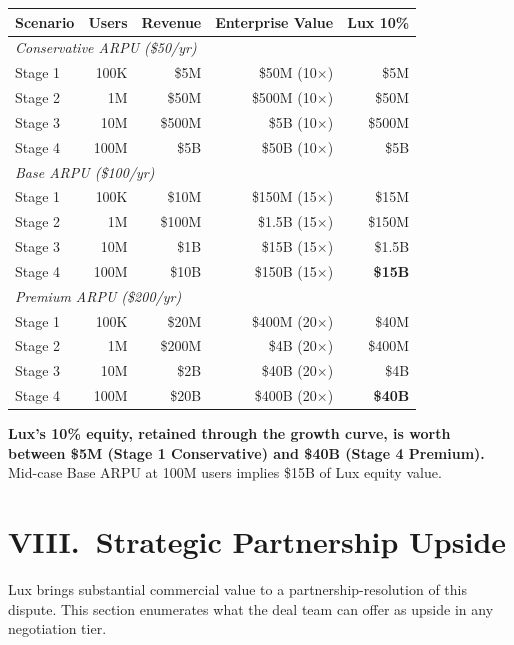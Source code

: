 \documentclass[11pt,letterpaper]{article}
\begin{document}
\begin{center}
\begin{small}
\begin{tabular}{lrrrr}
\toprule
\textbf{Scenario} & \textbf{Users} & \textbf{Revenue} & \textbf{Enterprise Value} & \textbf{Lux 10\%} \\
\midrule
\multicolumn{5}{l}{\textit{Conservative ARPU (\$50/yr)}} \\
Stage 1 & 100K & \$5M & \$50M (10$\times$) & \$5M \\
Stage 2 & 1M & \$50M & \$500M (10$\times$) & \$50M \\
Stage 3 & 10M & \$500M & \$5B (10$\times$) & \$500M \\
Stage 4 & 100M & \$5B & \$50B (10$\times$) & \$5B \\
\midrule
\multicolumn{5}{l}{\textit{Base ARPU (\$100/yr)}} \\
Stage 1 & 100K & \$10M & \$150M (15$\times$) & \$15M \\
Stage 2 & 1M & \$100M & \$1.5B (15$\times$) & \$150M \\
Stage 3 & 10M & \$1B & \$15B (15$\times$) & \$1.5B \\
Stage 4 & 100M & \$10B & \$150B (15$\times$) & \textbf{\$15B} \\
\midrule
\multicolumn{5}{l}{\textit{Premium ARPU (\$200/yr)}} \\
Stage 1 & 100K & \$20M & \$400M (20$\times$) & \$40M \\
Stage 2 & 1M & \$200M & \$4B (20$\times$) & \$400M \\
Stage 3 & 10M & \$2B & \$40B (20$\times$) & \$4B \\
Stage 4 & 100M & \$20B & \$400B (20$\times$) & \textbf{\$40B} \\
\bottomrule
\end{tabular}
\end{small}
\end{center}

\textbf{Lux's 10\% equity, retained through the growth curve, is
worth between \$5M (Stage 1 Conservative) and \$40B (Stage 4
Premium).} Mid-case Base ARPU at 100M users implies \$15B of Lux
equity value.

\section*{VIII.\ Strategic Partnership Upside}

Lux brings substantial commercial value to a partnership-resolution
of this dispute. This section enumerates what the deal team can
offer as upside in any negotiation tier.
\end{document}
